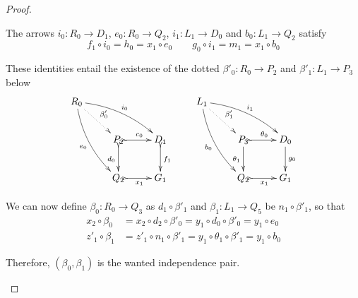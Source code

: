 \documentclass[a4paper,UKenglish,cleveref,pdftex,thm-restate,numberwithinsect]{lipics-v2021}
\begin{document}
\begin{proof}
\begin{enumerate}
		The arrows $i_0\colon R_0\to D_1$,
		$e_0\colon R_0\to Q_2$, $i_1\colon L_1\to D_0$ and $b_0\colon L_1 \to Q_2$ satisfy
		\[
		f_1\circ i_0  = h_0 =x_1\circ e_0 \qquad 
		g_0\circ i_1 = m_1 = x_1 \circ b_0 \]
		
		These identities entail the existence of the dotted
		$\beta'_0\colon R_0\to P_2$ and $\beta'_1\colon L_1\to P_3$ below
		\[\xymatrix{R_0 \ar@{.>}[dr]^{\beta'_0} \ar@/^.3cm/[drr]^{i_0}
			\ar@/_.3cm/[ddr]_{e_0} &&& L_1 \ar@{.>}[dr]^{\beta'_1} \ar@/^.3cm/[drr]^{i_1}
			\ar@/_.3cm/[ddr]_{b_0}\\ &P_2 \ar@{>->}[r]^{c_0} \ar@{>->}[d]_{d_0}& D_1
			\ar@{>->}[d]^{f_1} & &P_3 \ar@{>->}[r]^{\theta_0} \ar[d]_{\theta_1}& D_0 \ar[d]^{g_0}\\ &Q_2\ar@{>->}[r]_{x_1} & G_1 & &Q_2\ar@{>->}[r]_{x_1} & G_1}\]
		
                    We can now define $\beta_0\colon R_0\to Q_3$ as $d_1\circ \beta'_1$ and $\beta_1\colon L_1\to Q_5$ be $n_1\circ \beta'_1$, so that
		\begin{align*}
			x_2\circ \beta_0 & =x_2\circ d_2\circ \beta'_0 = y_1\circ d_0\circ \beta'_0=y_1\circ e_0\\
			z'_1 \circ \beta_1 & = z'_1 \circ n_1\circ \beta'_1 =y_1\circ \theta_1\circ \beta'_1=y_1\circ b_0
		\end{align*}
		
		Therefore, $(\beta_0, \beta_1)$ is the wanted independence pair.
		

\end{enumerate}
\end{proof}
\end{document}

